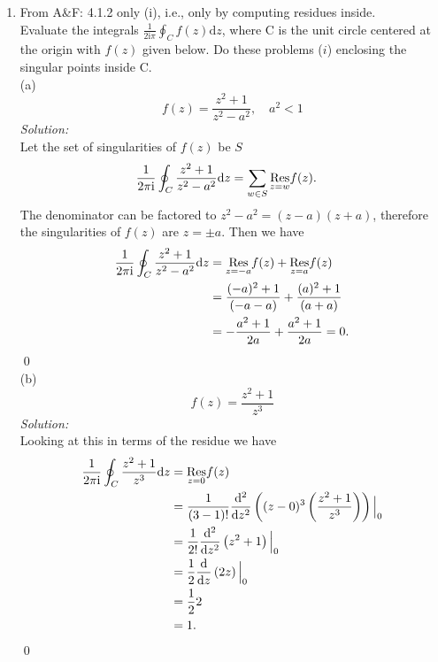 \documentclass[10pt]{amsart}
\newcommand{\D}{\mathrm{d}}
\newcommand{\I}{\mathrm{i}}
\theoremstyle{nonumberplain}
\begin{document}
\mline
\begin{enumerate}[label={\bf {\arabic*}:}]
\item From A\&F: 4.1.2 only (i), i.e., only by computing residues inside.\\
Evaluate the integrals $\frac 1 {2 \I \pi} \oint_C f(z) \D z$, where C is the unit circle centered at the origin with $f(z)$ given below.
Do these problems ($i$) enclosing the singular points inside C. \\

\noindent
(a)
$$
f(z) = \frac {z^2 + 1}{ z^2 - a^2 }, \quad a^2 < 1
$$
\textit{Solution:} \\
Let the set of singularities of $f(z)$ be $S$
\begin{align*}
\frac 1 {2 \pi \I} \oint_C \frac {z^2 + 1}{ z^2 - a^2 } \D z
	&= \sum_{w \in S} \underset{z=w}{\rm Res} f(z).
\end{align*}
The denominator can be factored to $z^2 - a^2 = (z - a)(z + a)$, therefore the singularities of $f(z)$ are $z = \pm a$.
Then we have
\begin{align*}
\frac 1 {2 \pi \I} \oint_C \frac {z^2 + 1}{ z^2 - a^2 } \D z
	&= \underset{z=-a}{\rm Res} f(z) + \underset{z=a}{\rm Res} f(z) \\
	&= \frac {(-a)^2 + 1}{ (-a - a) } + \frac {(a)^2 + 1}{ (a +a) } \\
	&= - \frac {a^2 + 1}{ 2a } + \frac {a^2 + 1}{ 2a } = 0.
\end{align*}
\qed \\

\noindent
(b)
$$
f(z) = \frac {z^2 + 1}{ z^3 }
$$
\textit{Solution:} \\
Looking at this in terms of the residue we have
\begin{align*}
\frac 1 {2 \pi \I} \oint_C \frac {z^2 + 1}{ z^3 } \D z
	&= \underset{z=0}{\rm Res} f(z) \\
	&= \frac 1 {(3 - 1)!} \frac {\D^2} {\D z^2} \left( (z - 0)^3\left( \frac {z^2 + 1}{ z^3 } \right) \right) \Big|_0 \\
	&= \frac 1 {2!} \frac {\D^2} {\D z^2} \left( z^2 + 1 \right) \Big|_0 \\
	&= \frac 1 2 \frac {\D} {\D z} \left( 2z \right) \Big|_0 \\
	&= \frac 1 2 2  \\
	&= 1.
\end{align*}
\qed \\


\end{enumerate}
\end{document}
